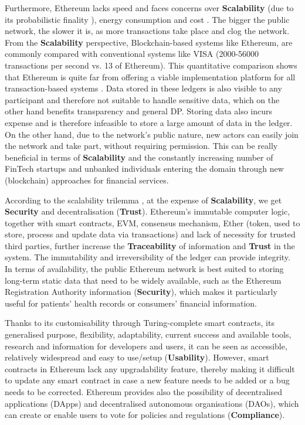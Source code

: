 Furthermore, Ethereum lacks speed and faces concerns over \textbf{Scalability} (due to its probabilistic finality \cite{probabilistic_finality}), energy consumption and cost \cite{dlt_3}. The bigger the public network, the slower it is, as more transactions take place and clog the network. From the \textbf{Scalability} perspective, Blockchain-based systems like Ethereum, are commonly compared \cite{eth_scaling_6} with conventional systems like VISA (2000-56000 transactions per second vs. 13 of Ethereum). This quantitative comparison shows that Ethereum is quite far from offering a viable implementation platform for all transaction-based systems \cite{eth_scalability_quantitative_analysis}. Data stored in these ledgers is also visible to any participant and therefore not suitable to handle sensitive data, which on the other hand benefits transparency and general DP. Storing data also incurs expense and is therefore infeasible to store a large amount of data in the ledger. On the other hand, due to the network's public nature, new actors can easily join the network and take part, without requiring permission. This can be really beneficial in terms of \textbf{Scalability} and the constantly increasing number of FinTech startups and unbanked individuals entering the domain through new (blockchain) approaches for financial services.

According to the scalability trilemma \cite{eth_scalability_quantitative_analysis}, at the expense of \textbf{Scalability}, we get \textbf{Security} and decentralisation (\textbf{Trust}). Ethereum's immutable computer logic, together with smart contracts, EVM, consensus mechanism, Ether (token, used to store, process and update data via transactions) and lack of necessity for trusted third parties, further increase the \textbf{Traceability} of information and \textbf{Trust} in the system. The immutability and irreversibility of the ledger can provide integrity. In terms of availability, the public Ethereum network is best suited to storing long-term static data that need to be widely available, such as the Ethereum Registration Authority information \cite{eth_availability} (\textbf{Security}), which makes it particularly useful for patients' health records or consumers' financial information. 

Thanks to its customisability through Turing-complete smart contracts, its generalised purpose, flexibility, adaptability, current success and available tools, research and information for developers and users, it can be seen as accessible, relatively widespread and easy to use/setup (\textbf{Usability}). However, smart contracts in Ethereum lack any upgradability feature, thereby making it difficult to update any smart contract in case a new feature needs to be added or a bug needs to be corrected. Ethereum provides also the possibility of decentralised applications (DApps) and decentralised autonomous organisations (DAOs), which can create or enable users to vote for policies and regulations (\textbf{Compliance}). 

